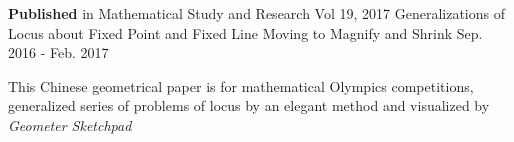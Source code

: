 \begin{cventries}
  \cventry
    {\textbf{Published} in Mathematical Study and Research Vol 19, 2017} %
    {Generalizations of Locus about Fixed Point and Fixed Line Moving to Magnify and Shrink} %
    {} %
    {Sep. 2016 - Feb. 2017} %
    {
      \begin{cvitems} %
        \item {This Chinese geometrical paper is for mathematical Olympics competitions, generalized series of problems of locus by an elegant method and visualized by \textit{Geometer Sketchpad}}
      \end{cvitems}
    }
    

\end{cventries}
